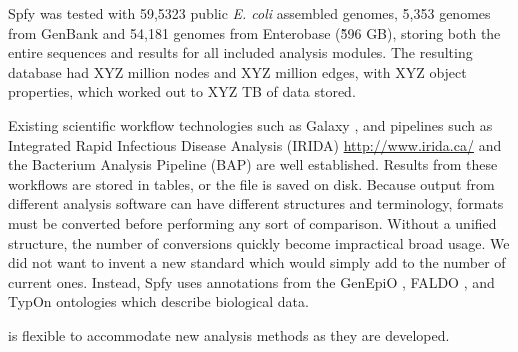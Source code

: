 Spfy was tested with 59,5323 public \textit{E. coli} assembled genomes, 5,353 genomes from GenBank and 54,181 genomes from Enterobase (\~596 GB), storing both the entire sequences and results for all included analysis modules.
The resulting database had XYZ million nodes and XYZ million edges, with XYZ object properties, which worked out to XYZ TB of data stored.


Existing scientific workflow technologies such as Galaxy \citep{goecks2010galaxy}, and pipelines such as Integrated Rapid Infectious Disease Analysis (IRIDA) \url{http://www.irida.ca/} and the Bacterium Analysis Pipeline (BAP) \citep{thomsen2016bacterial} are well established.
Results from these workflows are stored in tables, or the file is saved on disk.
Because output from different analysis software can have different structures and terminology, formats must be converted before performing any sort of comparison.
Without a unified structure, the number of conversions quickly become impractical broad usage.
We did not want to invent a new standard which would simply add to the number of current ones.
Instead, Spfy uses annotations from the GenEpiO \citep{griffiths2017context}, FALDO \citep{bolleman2016faldo}, and TypOn \citep{vaz2014typon} ontologies which describe biological data.

is flexible to accommodate new analysis methods as they are developed.



